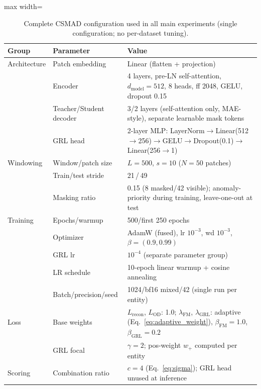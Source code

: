 \begin{table}[tp]
\footnotesize
\centering
\caption{Complete CSMAD configuration used in all main experiments (single configuration; no
  per-dataset tuning).}
\label{tab:csmad_config}
\setlength{\tabcolsep}{4pt}
\begin{adjustbox}{max width=\linewidth}
\begin{tabular}{llp{8.5cm}}
\toprule
Group & Parameter & Value \\
\midrule
Architecture & Patch embedding & Linear (flatten + projection) \\
             & Encoder         & 4 layers, pre-LN self-attention, $d_{\mathrm{model}}=512$, 8 heads, ff 2048, GELU, dropout 0.15 \\
             & Teacher/Student decoder & 3/2 layers (self-attention only, MAE-style), separate learnable mask tokens \\
             & GRL head & 2-layer MLP: LayerNorm$\to$\allowbreak Linear(512$\to$256)$\to$\allowbreak GELU$\to$\allowbreak Dropout(0.1)$\to$\allowbreak Linear(256$\to$1) \\
\midrule
Windowing & Window/patch size & $L=500$, $s=10$ ($N=50$ patches) \\
          & Train/test stride & 21\,/\,49 \\
          & Masking ratio & 0.15 (8 masked/42 visible); anomaly-priority during training, leave-one-out at test \\
\midrule
Training & Epochs/warmup & 500/first 250 epochs \\
         & Optimizer & AdamW (fused), lr $10^{-3}$, wd $10^{-3}$, $\beta=(0.9,0.99)$ \\
         & GRL lr & $10^{-4}$ (separate parameter group) \\
         & LR schedule & 10-epoch linear warmup + cosine annealing \\
         & Batch/precision/seed & 1024/bf16 mixed/42 (single run per entity) \\
\midrule
Loss & Base weights & $L_{\mathrm{recon}}$, $L_{\mathrm{OD}}$: 1.0; $\lambda_{\mathrm{FM}}$, $\lambda_{\mathrm{GRL}}$: adaptive (Eq.~\ref{eq:adaptive_weight}), $\beta_{\mathrm{FM}}=1.0$, $\beta_{\mathrm{GRL}}=0.2$ \\
     & GRL focal & $\gamma=2$; pos-weight $w_+$ computed per entity \\
\midrule
Scoring & Combination ratio & $c=4$ (Eq.~\ref{eq:sigma}); GRL head unused at inference \\
\bottomrule
\end{tabular}
\end{adjustbox}
\end{table}

